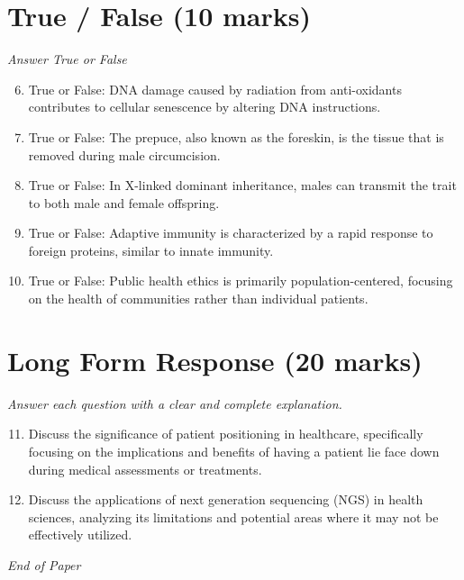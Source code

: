 \documentclass[12pt]{article}
\begin{document}
\section*{True / False (10 marks)}
\textit{Answer True or False}
\begin{enumerate}[label=\arabic*.]
\setcounter{enumi}{5}
\item True or False: DNA damage caused by radiation from anti-oxidants contributes to cellular senescence by altering DNA instructions.
\item True or False: The prepuce, also known as the foreskin, is the tissue that is removed during male circumcision.
\item True or False: In X-linked dominant inheritance, males can transmit the trait to both male and female offspring.
\item True or False: Adaptive immunity is characterized by a rapid response to foreign proteins, similar to innate immunity.
\item True or False: Public health ethics is primarily population-centered, focusing on the health of communities rather than individual patients.
\end{enumerate}

\section*{Long Form Response (20 marks)}
\textit{Answer each question with a clear and complete explanation.}
\begin{enumerate}[label=\arabic*.]
\setcounter{enumi}{10}
\item Discuss the significance of patient positioning in healthcare, specifically focusing on the implications and benefits of having a patient lie face down during medical assessments or treatments.
\item Discuss the applications of next generation sequencing (NGS) in health sciences, analyzing its limitations and potential areas where it may not be effectively utilized.
\end{enumerate}

\vfill
\noindent\textit{End of Paper}
\end{document}
